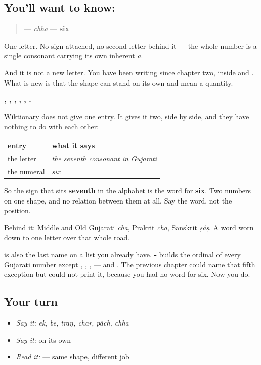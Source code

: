 \subsection*{You'll want to know: }
\begin{quote}
\textbf{} — \emph{chha} — \textbf{six}
\end{quote}

One letter. No sign attached, no second letter behind it — the whole number is a single consonant carrying its own inherent \emph{a}.

And it is not a new letter. You have been writing \textbf{} since chapter two, inside \textbf{} and \textbf{}. What is new is that the shape can stand on its own and mean a quantity.

\textbf{, , , , , .}

\begin{grammarlens}[title={What you've built: one shape, two entries}]
Wiktionary does not give \textbf{} one entry. It gives it two, side by side, and they have nothing to do with each other:

\noindent
\begin{tabularx}{\linewidth}{@{}>{\raggedright\arraybackslash}X>{\raggedright\arraybackslash}X@{}}
\toprule
\textbf{entry} & \textbf{what it says} \\
\midrule
the letter & \emph{the seventh consonant in Gujarati} \\
the numeral & \emph{six} \\
\bottomrule
\end{tabularx}

So the sign that sits \textbf{seventh} in the alphabet is the word for \textbf{six}. Two numbers on one shape, and no relation between them at all. Say the word, not the position.

Behind it: Middle and Old Gujarati \emph{cha}, Prakrit \emph{cha}, Sanskrit \emph{ṣáṣ}. A word worn down to one letter over that whole road.

\textbf{} is also the last name on a list you already have. \textbf{-} builds the ordinal of every Gujarati number except \textbf{}, \textbf{}, \textbf{}, \textbf{} — and \textbf{}. The previous chapter could name that fifth exception but could not print it, because you had no word for six. Now you do.
\end{grammarlens}

\subsection*{Your turn}
\begin{itemize}
\raggedright
  \item \emph{Say it:} \emph{ek, be, traṇ, chār, pā̃ch, chha}
  \item \emph{Say it:} \textbf{} on its own
  \item \emph{Read it:} \textbf{} — same shape, different job
\end{itemize}

